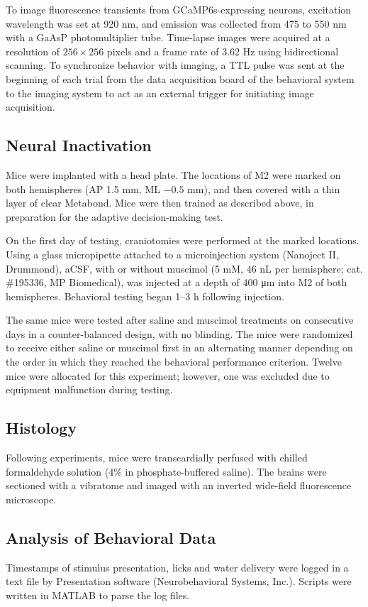 To image fluorescence transients from GCaMP6s-expressing neurons, excitation wavelength was set at 920 nm, and emission was collected from 475 to 550 nm with a GaAsP photomultiplier tube. Time-lapse images were acquired at a resolution of $256 \times 256$ pixels and a frame rate of 3.62 Hz using bidirectional scanning. To synchronize behavior with imaging, a TTL pulse was sent at the beginning of each trial from the data acquisition board of the behavioral system to the imaging system to act as an external trigger for initiating image acquisition.

\subsection*{Neural Inactivation}
Mice were implanted with a head plate. The locations of M2 were marked on both hemispheres (AP 1.5 mm, ML $-0.5$ mm), and then covered with a thin layer of clear Metabond. Mice were then trained as described above, in preparation for the adaptive decision-making test. 

On the first day of testing, craniotomies were performed at the marked locations. Using a glass micropipette attached to a microinjection system (Nanoject II, Drummond), aCSF, with or without muscimol (5 mM, 46 nL per hemisphere; cat. \#195336, MP Biomedical), was injected at a depth of 400 \si{\um} into M2 of both hemispheres. Behavioral testing began 1--3 h following injection. 

The same mice were tested after saline and muscimol treatments on consecutive days in a counter-balanced design, with no blinding. The mice were randomized to receive either saline or muscimol first in an alternating manner depending on the order in which they reached the behavioral performance criterion. Twelve mice were allocated for this experiment; however, one was excluded due to equipment malfunction during testing.

\subsection*{Histology}
Following experiments, mice were transcardially perfused with chilled formaldehyde solution (4\% in phosphate-buffered saline). The brains were sectioned with a vibratome and imaged with an inverted wide-field fluorescence microscope.

\subsection*{Analysis of Behavioral Data}
Timestamps of stimulus presentation, licks and water delivery were logged in a text file by Presentation software (Neurobehavioral Systems, Inc.). Scripts were written in MATLAB to parse the log files. 

